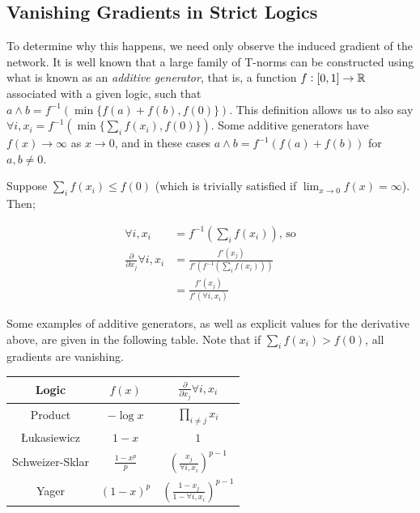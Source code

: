 \subsection{Vanishing Gradients in Strict Logics}
\label{section:prodvanishgradient}

To determine why this happens, we need only observe the induced gradient of the network. It is well known that a large family of T-norms can be constructed using what is known as an \textit{additive generator}, that is, a function $f:[0,1]\to\mathbb{R}$ associated with a given logic, such that $a \land b = f^{-1}(\min\{f(a) + f(b),f(0)\})$. This definition allows us to also say $\forall i, x_i = f^{-1}(\min\{\sum_i f(x_i),f(0)\})$. Some additive generators have $f(x) \rightarrow \infty$ as $x \rightarrow 0$, and in these cases $a \land b = f^{-1}(f(a) + f(b))$ for $a, b \neq 0$.

Suppose $\sum_i f(x_i) \leq f(0)$ (which is trivially satisfied if $\lim_{x\rightarrow 0}f(x) = \infty$). Then;

$$
\begin{aligned}
\forall i, x_i 
&= f^{-1}(\sum_i f(x_i)) \text{, so} \\
\frac{\partial}{\partial x_j} \forall i, x_i 
&= \frac{
f'(x_j)
}{
f'(f^{-1}(\sum_i f(x_i)))
} \\
&= \frac{
f'(x_j)
}{
f'(\forall i, x_i )
}
\end{aligned}
$$

Some examples of additive generators, as well as explicit values for the derivative above, are given in the following table. Note that if $\sum_i f(x_i) > f(0)$, all gradients are vanishing.

\begin{center}
    \begin{tabular}{ c | c c }
        Logic & $f(x)$ & $\frac{\partial}{\partial x_j} \forall i, x_i$ \\    
        \hline
        Product 
        & $-\log x$
        & $\prod_{i \neq j} x_i$ \\
        Łukasiewicz
        & $1 - x$ 
        & $1$ \\
        Schweizer-Sklar
        & $\frac{1-x^p}{p}$ 
        & $\left(\frac{x_j}{\forall i, x_i}\right)^{p-1}$ \\
        Yager
        & $(1-x)^p$ 
        & $\left(\frac{1-x_j}{1-\forall i, x_i}\right)^{p-1}$ \\
    \end{tabular}
\end{center}

